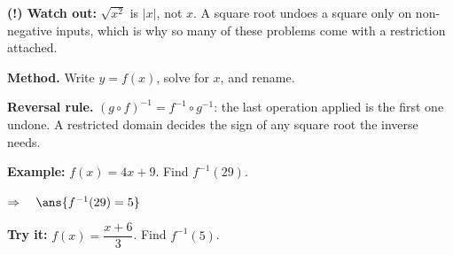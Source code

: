 \documentclass[12pt]{article}
\begin{document}
\begin{watchoutbox}
\textbf{(!) Watch out:} $\sqrt{x^{2}}$ is $|x|$, not $x$. A square root undoes a square only on non-negative inputs, which is why so many of these problems come with a restriction attached.
\end{watchoutbox}


\begin{formulabox}
\textbf{Method.} Write $y = f(x)$, solve for $x$, and rename. \par
\textbf{Reversal rule.} $(g \circ f)^{-1} = f^{-1} \circ g^{-1}$: the last operation applied is the first one undone. A restricted domain decides the sign of any square root the inverse needs.
\end{formulabox}

\begin{examplebox}
\textbf{Example:} \quad $f(x) = 4x + 9$. Find $f^{-1}(29)$.

$\Rightarrow\quad \ans{f^{-1}(29) = 5}$
\end{examplebox}

\begin{tryitbox}
\textbf{Try it:} \quad $f(x) = \dfrac{x + 6}{3}$. Find $f^{-1}(5)$.\\[2pt]
\end{tryitbox}
\end{document}
